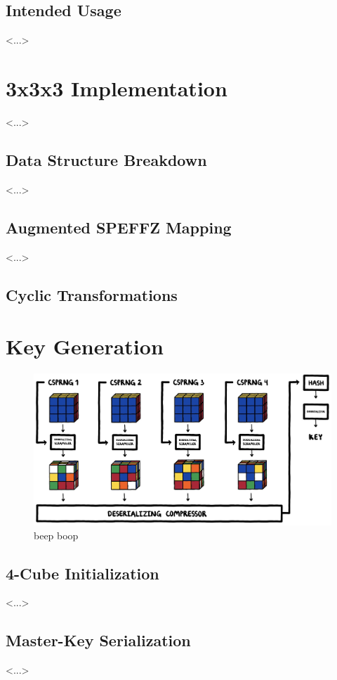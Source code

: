 \documentclass[12pt]{article}
\begin{document}
\subsection{Intended Usage}
<...>

\section{3x3x3 Implementation}
<...>

\subsection{Data Structure Breakdown}
<...>

\subsection{Augmented SPEFFZ Mapping}
<...>

\subsection{Cyclic Transformations}

\section{Key Generation}

\begin{figure}[H]
    \centering
    \includegraphics[width=\textwidth]{key_gen/keygen.jpg}
    \caption{beep boop}
\end{figure}

\subsection{4-Cube Initialization}
<...>

\subsection{Master-Key Serialization}
<...>
\end{document}

